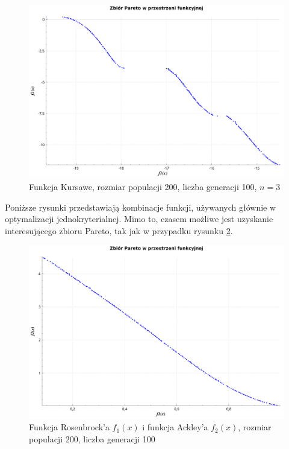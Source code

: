 \documentclass[11pt,a4paper]{article}
\begin{document}
\begin{figure}[H]
\centering
\includegraphics[width=14cm]{kursawe_200_100}
\caption{Funkcja Kursawe, rozmiar populacji 200, liczba generacji 100, \(n = 3\)}
\label{fig:kursawe_200_100}
\end{figure}

Poniższe rysunki przedstawiają kombinacje funkcji, używanych głównie w optymalizacji jednokryterialnej. Mimo to, czasem możliwe jest uzyskanie interesującego zbioru Pareto, tak jak w przypadku rysunku \ref{fig:rosenbrock_ackley_200_100}. 

\begin{figure}[H]
\centering
\includegraphics[width=14cm]{rosenbrock_ackley_200_100}
\caption{Funkcja Rosenbrock'a \(f_1(x)\) i funkcja Ackley'a \(f_2(x)\), rozmiar populacji 200, liczba generacji 100}
\label{fig:rosenbrock_ackley_200_100}
\end{figure}
\end{document}
